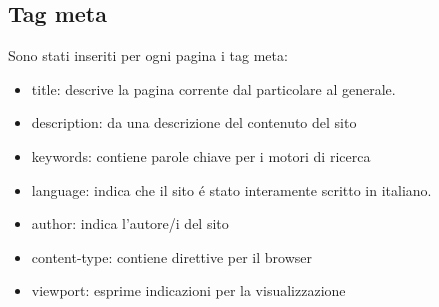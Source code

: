 \documentclass[12pt]{article}
\begin{document}
\begin{itemize}
			\end{itemize}	

			
			\newpage
			\subsection{Tag meta}
			
	 Sono stati inseriti per ogni pagina i tag meta:
	 		\begin{itemize}
				\item title: descrive la pagina corrente dal particolare al generale.
				\item description: da una descrizione del contenuto del sito
				\item keywords: contiene parole chiave per i motori di ricerca
				\item language: indica che il sito \'e stato interamente scritto in italiano.
				\item author: indica l'autore/i del sito
				\item content-type: contiene direttive per il browser
				\item viewport: esprime indicazioni per la visualizzazione
			\end{itemize}
\end{document}
